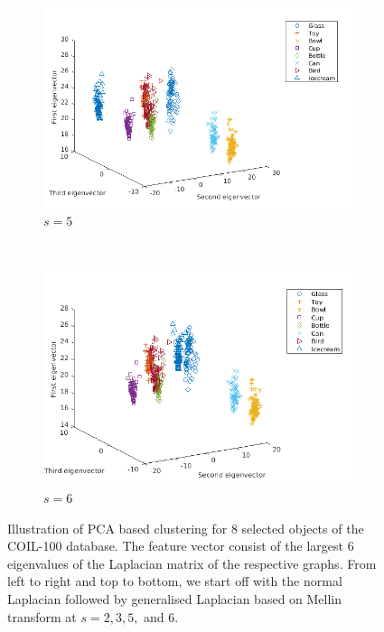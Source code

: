 \documentclass[10pt,a4paper]{article}
\theoremstyle{plain}
\theoremstyle{definition}
\begin{document}
\begin{figure}[H]
\begin{subfigure}[b]{0.5\textwidth}
		\includegraphics[width= \textwidth]{images/Mellin-s5.png}
		\caption{$s=5$}
		\label{}
	\end{subfigure}~
\begin{subfigure}[b]{0.5\textwidth}
	\includegraphics[width= \textwidth]{images/Mellin-s6.png}
	\caption{$s=6$}
	\label{}
\end{subfigure}
	\caption{Illustration of PCA based clustering for $8$ selected objects of the COIL-100 database. The feature vector consist of the largest $6$ eigenvalues of the Laplacian matrix of the respective graphs. From left to right and top to bottom, we start off with the normal Laplacian followed by generalised Laplacian based on Mellin transform at $s=2,3,5,$ and $6$. }
	\label{}
\end{figure}
\end{document}
